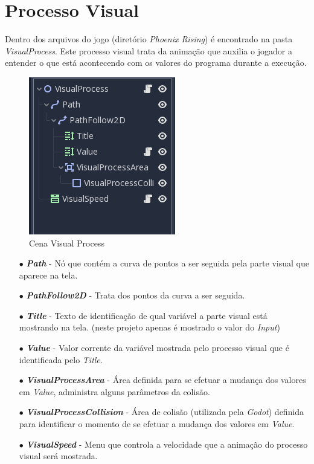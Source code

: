 \section{Processo Visual}

Dentro dos arquivos do jogo (diretório \textit{Phoenix Rising}) é encontrado na
pasta \textit{VisualProcess}. Este processo visual trata da animação que auxilia
o jogador a entender o que está acontecendo com os valores do programa durante
a execução.

\begin{figure}[H]
    \includegraphics[scale=0.8]{../figuras/cena_visual_process.png}
    \caption{Cena Visual Process}
\end{figure}

\begin{itemize}
    \item[$\bullet$]
        \textbf{\textit{Path}} - Nó que contém a curva de pontos a ser seguida 
        pela parte visual que aparece na tela.
    \item[$\bullet$]
        \textbf{\textit{PathFollow2D}} - Trata dos pontos da curva a ser 
        seguida.
    \item[$\bullet$]
        \textbf{\textit{Title}} - Texto de identificação de qual variável a 
        parte visual está mostrando na tela. (neste projeto apenas é mostrado 
        o valor do \textit{Input})
    \item[$\bullet$]
        \textbf{\textit{Value}} - Valor corrente da variável mostrada pelo
        processo visual que é identificada pelo \textit{Title}.
    \item[$\bullet$]
        \textbf{\textit{VisualProcessArea}} - Área definida para se efetuar a
        mudança dos valores em \textit{Value}, administra alguns parâmetros da
        colisão.
    \item[$\bullet$]
        \textbf{\textit{VisualProcessCollision}} - Área de colisão (utilizada
        pela \textit{Godot}) definida para identificar o momento de se efetuar 
        a mudança dos valores em \textit{Value}.
    \item[$\bullet$]
        \textbf{\textit{VisualSpeed}} - Menu que controla a velocidade que a 
        animação do processo visual será mostrada. 
\end{itemize}

